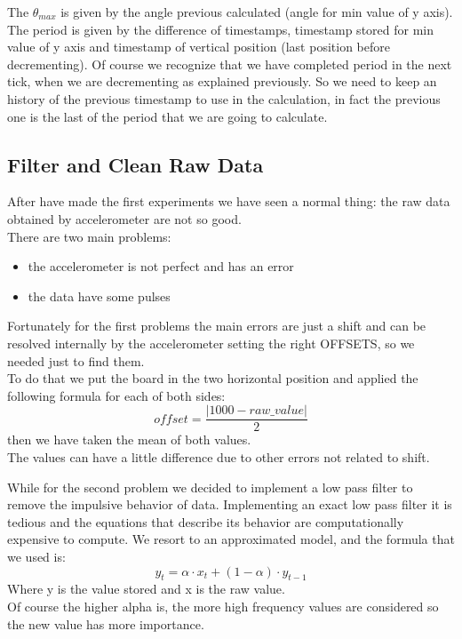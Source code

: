 The $\theta_{max}$ is given by the  angle previous calculated (angle for min value of y axis).\\
The period is given by the difference of timestamps, timestamp stored for min value of y axis and timestamp of vertical position (last position before decrementing).
Of course we recognize that we have completed period in the next tick, when we are decrementing as explained previously. So we need to keep an history of the previous timestamp to use in the calculation, in fact the previous one is the last of the period that we are going to calculate.

\subsection{Filter and Clean Raw Data}
After have made the first experiments we have seen a normal thing: the raw data obtained by accelerometer are not so good.\\
There are two main problems:
\begin{itemize}
	\item the accelerometer is not perfect and has an error
	\item the data have some pulses
\end{itemize} \par

Fortunately for the first problems the main errors are just a shift and can be resolved internally by the accelerometer setting the right OFFSETS, so we needed just to find them.\\
To do that we put the board in the two horizontal position and applied the following formula for each of both sides:
$$ offset = \frac{\left|1000-raw\_value\right|}{2}$$
then we have taken the mean of both values. \\
The values can have a little difference due to other errors not related to shift.\par

While for the second problem we decided to implement a low pass filter to remove the impulsive behavior of data. Implementing an exact low pass filter it is tedious and the equations that describe its behavior are computationally expensive to compute. We resort to an approximated model, and the formula \cite{Holt20045} that we used is:
$$ y_t = \alpha \cdot x_t + (1-\alpha) \cdot y_{t-1}$$
Where y is the value stored and x is the raw value.\\
Of course the higher alpha is, the more high frequency values are considered so the new value has more importance.\par

